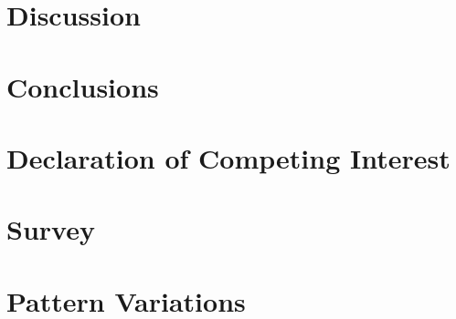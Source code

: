 \documentclass[final,5p,times]{elsarticle}%
\begin{document}
\begin{linenumbers}
\section{Discussion}
\label{sec:Discussion}



\section{Conclusions}
\label{sec:Conclusion}


\section{Declaration of Competing Interest}
\label{sec:DeclarationInterest}


%

\end{linenumbers}




\newpage
\clearpage
\appendix

\section{Survey}
\label{sec:Annexsurvey}


\section{Pattern Variations}
\label{sec:AnnexVariations}

\end{document}
